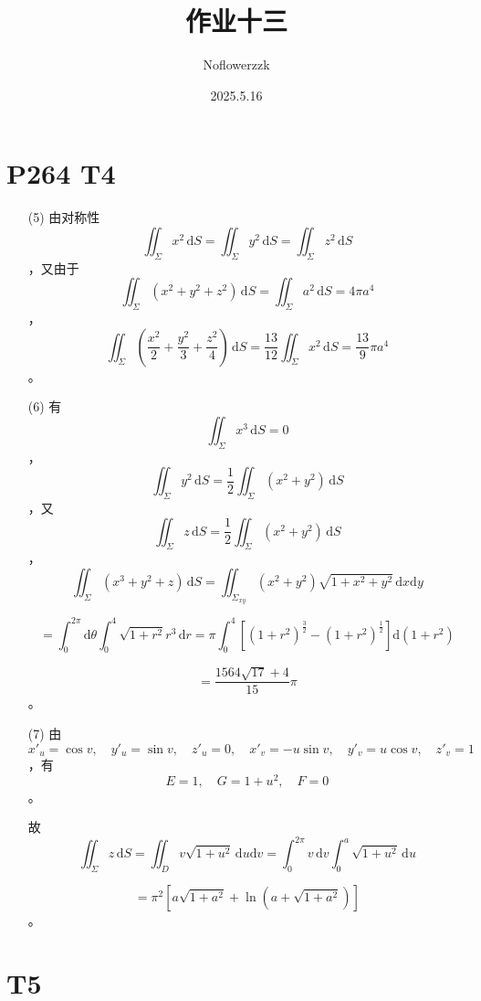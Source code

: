 \documentclass{article}
\title{作业十三}
\author{Noflowerzzk}
\date{2025.5.16}
\begin{document}
\maketitle

\section*{P264 T4}

\begin{itemize}
    \item[(5)] 由对称性 \[ \iint_{\Sigma} x^2 \,\mathrm{d}S = \iint_{\Sigma} y^2 \,\mathrm{d}S = \iint_{\Sigma} z^2 \,\mathrm{d}S \]，又由于 \[ \iint_{\Sigma} (x^2 + y^2 + z^2) \,\mathrm{d}S = \iint_{\Sigma} a^2 \,\mathrm{d}S = 4\pi a^4 \]，
     \[ \iint_{\Sigma} \left( \frac{x^2}{2} + \frac{y^2}{3} + \frac{z^2}{4} \right) \,\mathrm{d}S = \frac{13}{12} \iint_{\Sigma} x^2 \,\mathrm{d}S = \frac{13}{9} \pi a^4 \]。

    \item[(6)] 有 \[ \iint_{\Sigma} x^3 \,\mathrm{d}S = 0 \]，\[ \iint_{\Sigma} y^2 \,\mathrm{d}S = \frac{1}{2} \iint_{\Sigma} (x^2 + y^2) \,\mathrm{d}S \]，又 \[ \iint_{\Sigma} z \,\mathrm{d}S = \frac{1}{2} \iint_{\Sigma} (x^2 + y^2) \,\mathrm{d}S \]，\[ \iint_{\Sigma} (x^3 + y^2 + z) \,\mathrm{d}S = \iint_{\Sigma_{xy}} (x^2 + y^2) \sqrt{1 + x^2 + y^2} \,\mathrm{d}x \mathrm{d}y \]
    
    \[ = \int_0^{2\pi} \mathrm{d}\theta \int_0^4 \sqrt{1 + r^2} r^3 \,\mathrm{d}r = \pi \int_0^4 \left[(1 + r^2)^{\frac{3}{2}} - (1 + r^2)^{\frac{1}{2}}\right] \mathrm{d}(1 + r^2) \]
    
    \[ = \frac{1564 \sqrt{17} + 4}{15} \pi \]。

    \item[(7)] 由 \[ x'_u = \cos v, \quad y'_u = \sin v, \quad z'_u = 0, \quad x'_v = -u \sin v, \quad y'_v = u \cos v, \quad z'_v = 1 \]，有 \[ E = 1, \quad G = 1 + u^2, \quad F = 0 \]。
    
    故 \[ \iint_{\Sigma} z \,\mathrm{d}S = \iint_D v \sqrt{1 + u^2} \,\mathrm{d}u \mathrm{d}v = \int_0^{2\pi} v \,\mathrm{d}v \int_0^a \sqrt{1 + u^2} \,\mathrm{d}u \]
    
    \[ = \pi^2 \left[a \sqrt{1 + a^2} + \ln\left(a + \sqrt{1 + a^2}\right)\right] \]。
\end{itemize}

\section*{T5}
\end{document}
